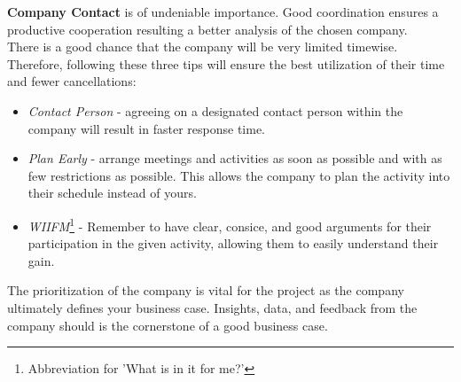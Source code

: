 \textbf{Company Contact} is of undeniable importance. Good coordination ensures a productive cooperation resulting a better analysis of the chosen company.
\\
There is a good chance that the company will be very limited timewise. Therefore, following these three tips will ensure the best utilization of their time and fewer cancellations:
\begin{itemize}
	\item \textit{Contact Person} - agreeing on a designated contact person within the company will result in faster response time.
	\item \textit{Plan Early} - arrange meetings and activities as soon as possible and with as few restrictions as possible. This allows the company to plan the activity into their schedule instead of yours.
	\item \textit{WIIFM}\footnote{Abbreviation for 'What is in it for me?'} - Remember to have clear, consice, and good arguments for their participation in the given activity, allowing them to easily understand their gain.
\end{itemize}
The prioritization of the company is vital for the project as the company ultimately defines your business case. Insights, data, and feedback from the company should is the cornerstone of a good business case.